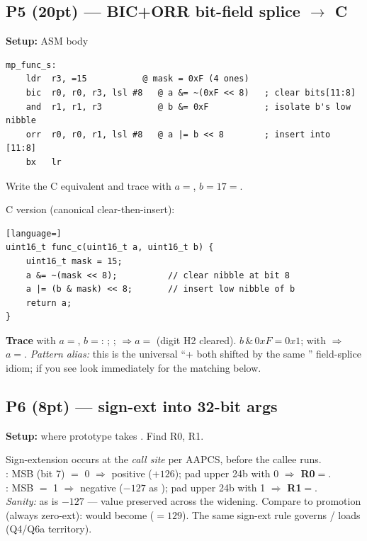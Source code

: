 \subsection{P5 (20pt) --- BIC+ORR bit-field splice $\to$ C}
\textbf{Setup:} ASM body
\begin{lstlisting}
mp_func_s:
    ldr  r3, =15           @ mask = 0xF (4 ones)
    bic  r0, r0, r3, lsl #8   @ a &= ~(0xF << 8)   ; clear bits[11:8]
    and  r1, r1, r3           @ b &= 0xF           ; isolate b's low nibble
    orr  r0, r0, r1, lsl #8   @ a |= b << 8        ; insert into [11:8]
    bx   lr
\end{lstlisting}
Write the C equivalent and trace with $a=$, $b=17=$.
\begin{qp}
C version (canonical clear-then-insert):
\begin{lstlisting}[language=]
uint16_t func_c(uint16_t a, uint16_t b) {
    uint16_t mask = 15;
    a &= ~(mask << 8);          // clear nibble at bit 8
    a |= (b & mask) << 8;       // insert low nibble of b
    return a;
}
\end{lstlisting}
\textbf{Trace} with $a=$, $b=$: ; ;  $\Rightarrow a=$ (digit H2 cleared). $b\,\&\,0xF = 0x1$;  with  $\Rightarrow$ \textbf{$a=$}. \emph{Pattern alias:} this is the universal ``+ both shifted by the same '' field-splice idiom; if you see  look immediately for the matching  below.
\end{qp}

\subsection{P6 (8pt) ---  sign-ext into 32-bit args}
\textbf{Setup:}  where prototype takes . Find R0, R1.
\begin{qp}
Sign-extension occurs at the \emph{call site} per AAPCS, before the callee runs.\\
: MSB (bit 7) $=$ 0 $\Rightarrow$ positive ($+126$); pad upper 24b with 0 $\Rightarrow$ \textbf{R0$=$}.\\
: MSB $=$ 1 $\Rightarrow$ negative ($-127$ as ); pad upper 24b with 1 $\Rightarrow$ \textbf{R1$=$}.\\
\emph{Sanity:}  as  is $-127$ --- value preserved across the widening. Compare to  promotion (always zero-ext):  would become  ($=129$). The same sign-ext rule governs  /  loads (Q4/Q6a territory).
\end{qp}

